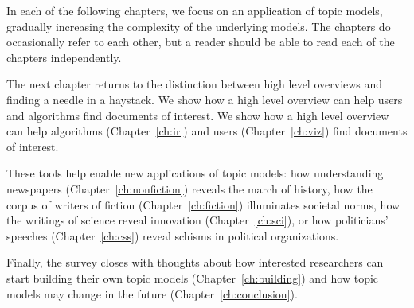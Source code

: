 In each of the following chapters, we focus on an application of topic
models, gradually increasing the complexity of the underlying models.
The chapters do occasionally refer to each other, but a reader should
be able to read each of the chapters independently.

The next chapter returns to the distinction between high level
overviews and finding a needle in a haystack.  We show how a high
level overview can help users and algorithms find documents of
interest.  We show how a high level overview can help
algorithms (Chapter~\ref{ch:ir}) and users (Chapter~\ref{ch:viz}) find documents
of interest.

These tools help enable new applications of topic models: how
understanding newspapers (Chapter~\ref{ch:nonfiction}) reveals the
march of history, how the corpus of writers of fiction
(Chapter~\ref{ch:fiction}) illuminates societal norms, how the
writings of science reveal innovation (Chapter~\ref{ch:sci}), or
how politicians' speeches (Chapter~\ref{ch:css}) reveal schisms in
political organizations.

Finally, the survey closes with thoughts about how interested
researchers can start building their own topic models
(Chapter~\ref{ch:building}) and how topic models may change in the
future (Chapter~\ref{ch:conclusion}).
